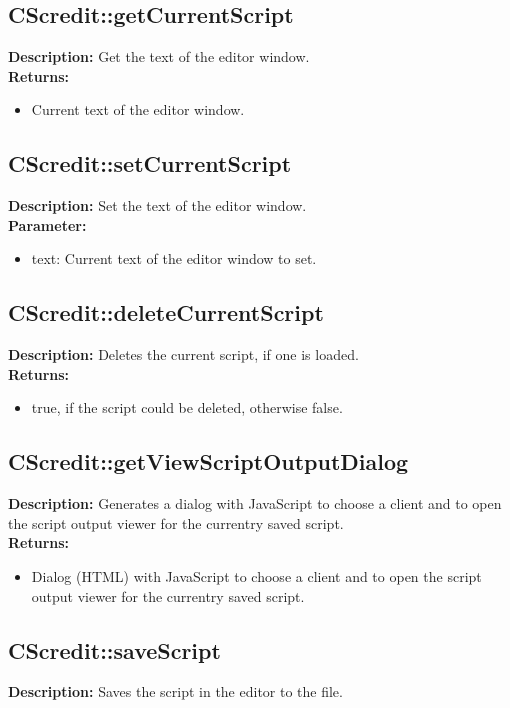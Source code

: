 \subsection{CScredit::getCurrentScript}
\textbf{Description:} Get the text of the editor window.\\
\textbf{Returns:}
\begin{itemize}
\item Current text of the editor window.
\end{itemize}

\subsection{CScredit::setCurrentScript}
\textbf{Description:} Set the text of the editor window.\\
\textbf{Parameter:}
\begin{itemize}
\item text: Current text of the editor window to set.
\end{itemize}

\subsection{CScredit::deleteCurrentScript}
\textbf{Description:} Deletes the current script, if one is loaded.\\
\textbf{Returns:}
\begin{itemize}
\item true, if the script could be deleted, otherwise false.
\end{itemize}

\subsection{CScredit::getViewScriptOutputDialog}
\textbf{Description:} Generates a dialog with JavaScript to choose a client and to open the script output viewer for the currentry saved script.\\
\textbf{Returns:}
\begin{itemize}
\item Dialog (HTML) with JavaScript to choose a client and to open the script output viewer for the currentry saved script.
\end{itemize}

\subsection{CScredit::saveScript}
\textbf{Description:} Saves the script in the editor to the file.\\

